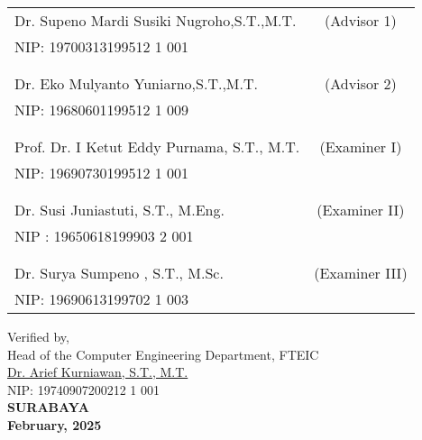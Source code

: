     \noindent
    \begin{tabularx}{\textwidth}{X c}
      Dr. Supeno Mardi Susiki Nugroho,S.T.,M.T.          & (Advisor 1) \\
      NIP: 19700313199512 1 001       & \\
      &  \\
      &  \\
      Dr. Eko Mulyanto Yuniarno,S.T.,M.T.     & (Advisor 2) \\
      NIP: 19680601199512 1 009       & \\
      &  \\
      &  \\
      Prof. Dr. I Ketut Eddy Purnama, S.T., M.T.  & (Examiner I) \\
      NIP: 19690730199512 1 001       & \\
      &  \\
      &  \\
      Dr. Susi Juniastuti, S.T., M.Eng.  & (Examiner II) \\
      NIP : 19650618199903 2 001       & \\
      &  \\
      &  \\
      Dr. Surya Sumpeno , S.T., M.Sc.            & (Examiner III) \\
      NIP: 19690613199702 1 003        & \\
    \end{tabularx}
  \endgroup

\vspace{2ex}

\begin{center}
  Verified by,\\
  Head of the Computer Engineering Department, FTEIC\\
  \vspace{10ex}
  \underline{Dr. Arief Kurniawan, S.T., M.T. }\\
  NIP: 19740907200212 1 001 \\
  \vspace{10ex}
  \textbf{SURABAYA} \\
  \textbf{February, 2025}
\end{center}
\endgroup